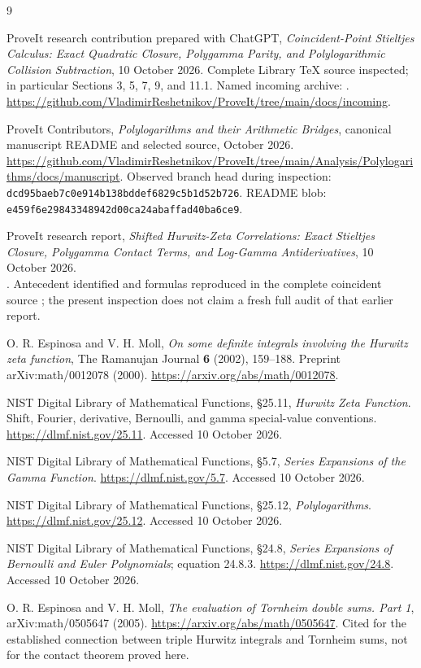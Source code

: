 \documentclass[11pt,a4paper]{article}
\numberwithin{equation}{section}
\theoremstyle{definition}
\newcommand{\pin}{\texttt{dcd95baeb7c0e914b138bddef6829c5b1d52b726}}
\begin{document}
\begin{thebibliography}{9}
\small\setlength{\parskip}{0pt}\setlength{\itemsep}{4pt}
\raggedright
{}
ProveIt research contribution prepared with ChatGPT,
\emph{Coincident-Point Stieltjes Calculus: Exact Quadratic Closure, Polygamma Parity, and Polylogarithmic Collision Subtraction}, 10 October 2026.
Complete Library TeX source inspected; in particular Sections 3, 5, 7, 9, and 11.1.
Named incoming archive: .
\url{https://github.com/VladimirReshetnikov/ProveIt/tree/main/docs/incoming}.

ProveIt Contributors,
\emph{Polylogarithms and their Arithmetic Bridges}, canonical manuscript README and selected source, October 2026.
\url{https://github.com/VladimirReshetnikov/ProveIt/tree/main/Analysis/Polylogarithms/docs/manuscript}.
Observed branch head during inspection: \pin.
README blob: \texttt{e459f6e29843348942d00ca24abaffad40ba6ce9}.

ProveIt research report,
\emph{Shifted Hurwitz-Zeta Correlations: Exact Stieltjes Closure, Polygamma Contact Terms, and Log-Gamma Antiderivatives}, 10 October 2026.
\\
.
Antecedent identified and formulas reproduced in the complete coincident source \cite{pc:coincident}; the present inspection does not claim a fresh full audit of that earlier report.

O. R. Espinosa and V. H. Moll,
\emph{On some definite integrals involving the Hurwitz zeta function},
The Ramanujan Journal \textbf{6} (2002), 159--188.
Preprint arXiv:math/0012078 (2000).
\url{https://arxiv.org/abs/math/0012078}.

NIST Digital Library of Mathematical Functions,
\S25.11, \emph{Hurwitz Zeta Function}.
Shift, Fourier, derivative, Bernoulli, and gamma special-value conventions.
\url{https://dlmf.nist.gov/25.11}. Accessed 10 October 2026.

NIST Digital Library of Mathematical Functions,
\S5.7, \emph{Series Expansions of the Gamma Function}.
\url{https://dlmf.nist.gov/5.7}. Accessed 10 October 2026.

NIST Digital Library of Mathematical Functions,
\S25.12, \emph{Polylogarithms}.
\url{https://dlmf.nist.gov/25.12}. Accessed 10 October 2026.

NIST Digital Library of Mathematical Functions,
\S24.8, \emph{Series Expansions of Bernoulli and Euler Polynomials}; equation 24.8.3.
\url{https://dlmf.nist.gov/24.8}. Accessed 10 October 2026.

O. R. Espinosa and V. H. Moll,
\emph{The evaluation of Tornheim double sums. Part 1}, arXiv:math/0505647 (2005).
\url{https://arxiv.org/abs/math/0505647}.
Cited for the established connection between triple Hurwitz integrals and Tornheim sums, not for the contact theorem proved here.
\end{thebibliography}
\end{document}
